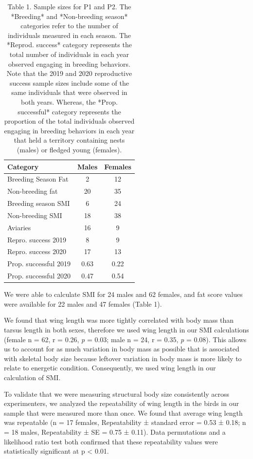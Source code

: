 \documentclass[
]{article}
\begin{document}
\begin{table}

\caption{\label{tab:sample size table}Table 1. Sample sizes for P1 and P2.  The *Breeding* and *Non-breeding season* categories refer to the number of individuals measured in each season. The *Reprod. success* category represents the total number of individuals in each year observed engaging in breeding behaviors. Note that the 2019 and 2020 reproductive success sample sizes include some of the same individuals that were observed in both years. Whereas, the *Prop. successful* category represents the proportion of the total individuals observed engaging in breeding behaviors in each year that held a territory containing nests (males) or fledged young (females).}
\centering
\begin{tabular}[t]{l|c|c}
\hline
Category & Males & Females\\
\hline
Breeding Season Fat & 2 & 12\\
\hline
Non-breeding fat & 20 & 35\\
\hline
Breeding season SMI & 6 & 24\\
\hline
Non-breeding SMI & 18 & 38\\
\hline
Aviaries & 16 & 9\\
\hline
Repro. success 2019 & 8 & 9\\
\hline
Repro. success 2020 & 17 & 13\\
\hline
Prop. successful 2019 & 0.63 & 0.22\\
\hline
Prop. successful 2020 & 0.47 & 0.54\\
\hline
\end{tabular}
\end{table}

We were able to calculate SMI for 24 males and 62 females, and fat score
values were available for 22 males and 47 females (Table 1).

We found that wing length was more tightly correlated with body mass
than tarsus length in both sexes, therefore we used wing length in our
SMI calculations (female n = 62, r = 0.26, \emph{p} = 0.03; male n = 24,
r = 0.35, \emph{p} = 0.08). This allows us to account for as much
variation in body mass as possible that is associated with skeletal body
size because leftover variation in body mass is more likely to relate to
energetic condition. Consequently, we used wing length in our
calculation of SMI.

To validate that we were measuring structural body size consistently
across experimenters, we analyzed the repeatability of wing length in
the birds in our sample that were measured more than once. We found that
average wing length was repeatable (n = 17 females, Repeatability ±
standard error = 0.53 ± 0.18; n = 18 males, Repeatability ± SE = 0.75 ±
0.11). Data permutations and a likelihood ratio test both confirmed that
these repeatability values were statistically significant at p
\textless{} 0.01.
\end{document}

